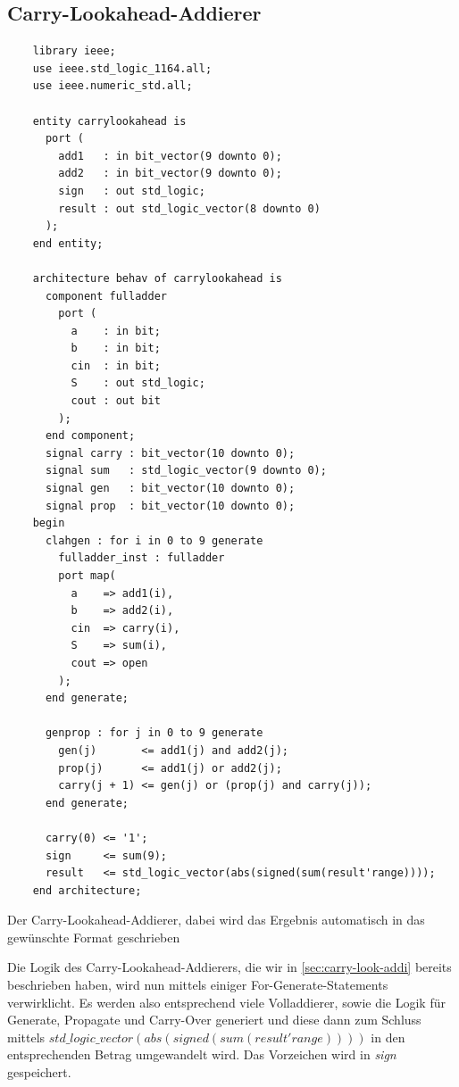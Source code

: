 \documentclass{report}
\newenvironment{longlisting}{\captionsetup{type=listing}}{}
\begin{document}
\subsection{Carry-Lookahead-Addierer}
\begin{longlisting}
  \centering
  \begin{verbatim}
    library ieee;
    use ieee.std_logic_1164.all;
    use ieee.numeric_std.all;
    
    entity carrylookahead is
      port (
        add1   : in bit_vector(9 downto 0);
        add2   : in bit_vector(9 downto 0);
        sign   : out std_logic;
        result : out std_logic_vector(8 downto 0)
      );
    end entity;
    
    architecture behav of carrylookahead is
      component fulladder
        port (
          a    : in bit;
          b    : in bit;
          cin  : in bit;
          S    : out std_logic;
          cout : out bit
        );
      end component;
      signal carry : bit_vector(10 downto 0);
      signal sum   : std_logic_vector(9 downto 0);
      signal gen   : bit_vector(10 downto 0);
      signal prop  : bit_vector(10 downto 0);
    begin
      clahgen : for i in 0 to 9 generate
        fulladder_inst : fulladder
        port map(
          a    => add1(i),
          b    => add2(i),
          cin  => carry(i),
          S    => sum(i),
          cout => open
        );
      end generate;
    
      genprop : for j in 0 to 9 generate
        gen(j)       <= add1(j) and add2(j);
        prop(j)      <= add1(j) or add2(j);
        carry(j + 1) <= gen(j) or (prop(j) and carry(j));
      end generate;

      carry(0) <= '1';
      sign     <= sum(9);
      result   <= std_logic_vector(abs(signed(sum(result'range))));
    end architecture;    
  \end{verbatim}
  \caption{Der Carry-Lookahead-Addierer, dabei wird das Ergebnis automatisch in das gewünschte Format geschrieben}
  \label{code:cla}
  
\end{longlisting}
\newpage
\noindent
Die Logik des Carry-Lookahead-Addierers, die wir in \ref{sec:carry-look-addi} bereits beschrieben haben, wird nun mittels einiger For-Generate-Statements verwirklicht. Es werden also entsprechend viele Volladdierer, sowie die Logik für Generate, Propagate und Carry-Over generiert und diese dann zum Schluss mittels $std\_logic\_vector(abs(signed(sum(result'range))))$ in den entsprechenden Betrag umgewandelt wird. Das Vorzeichen wird in \textit{sign} gespeichert.\cite{vhdlwhiz}\cite{nandland}
\end{document}
